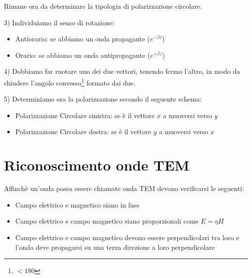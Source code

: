 	Rimane ora da determinare la tipologia di polarizzazione circolare.
	
	\raggedright{3) Individuiamo il senso di rotazione:}

	\begin{itemize}

	\item Antiorario: se abbiamo un onda propagante ($e^{-\beta z}$)
	\item Orario: se abbiamo un onda antipropagante ($e^{+\beta z}$)

	\end{itemize}
	\raggedright{4) Dobbiamo far ruotare uno dei due vettori, tenendo fermo l'altro, in modo da chiudere l'angolo convesso\footnote{$<180$} formato dai due.}

	\raggedright{	5) Determiniamo ora la polarizzazione secondo il seguente schema:}

	\begin{itemize}
	\item Polarizzazione Circolare sinistra: se è il vettore $x$ a muoversi verso $y$ 
	\item Polarizzazione Circolare destra: se è il vettore $y$ a muoversi verso $x$ 
	\end{itemize}	


	\section{Riconoscimento onde TEM}
	Affinchè un'onda possa essere chiamate onda TEM devono verificarsi le seguenti:

	\begin{itemize}

	\item Campo elettrico e magnetico siano in fase 

	\item Campo elettrico e campo magnetico siano proporzionali come $E=\eta H$

	\item Campo elettrico e campo magnetico devono essere perpendicolari tra loro e l'onda deve propagarsi su una terza direzione a loro perpendicolare

	\end{itemize}